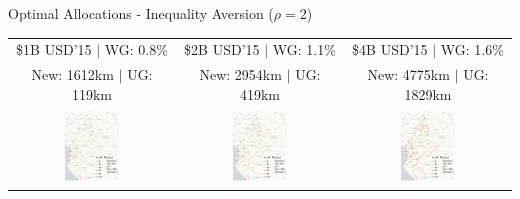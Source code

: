 \documentclass[aspectratio=169,xcolor=dvipsnames]{beamer}
\begin{document}
\begin{frame}{Optimal Allocations - Inequality Aversion ($\rho = 2$)}
\vspace{-1mm}
\begin{adjustbox}{center}
\begin{tabular}{@{}c@{}|@{}c@{}|@{}c@{}} 
\$1B USD'15 $|$ WG: 0.8\% & \$2B USD'15 $|$ WG: 1.1\% & \$4B USD'15 $|$ WG: 1.6\%  \\
New: 1612km $|$ UG: 119km & New: 2954km $|$ UG: 419km & New: 4775km $|$ UG: 1829km \\ 
\includegraphics[width=0.38\textwidth, trim= {0.9cm 0 0.9cm 0}, clip]{"../figures/GE/trans_africa_network_GE_add_20g_1b_fixed_cgc_sigma3.8_rho2_julia_MACR_90kmh_google_perc_ug.pdf"} & 
\includegraphics[width=0.38\textwidth, trim= {0.9cm 0 0.9cm 0}, clip]{"../figures/GE/trans_africa_network_GE_add_20g_2b_fixed_cgc_sigma3.8_rho2_julia_MACR_90kmh_google_perc_ug.pdf"} &
\includegraphics[width=0.38\textwidth, trim= {0.9cm 0 0.9cm 0}, clip]{"../figures/GE/trans_africa_network_GE_add_20g_4b_fixed_cgc_sigma3.8_rho2_julia_MACR_90kmh_google_perc_ug.pdf"}  
\end{tabular}
\end{adjustbox}
\end{frame}
\end{document}
